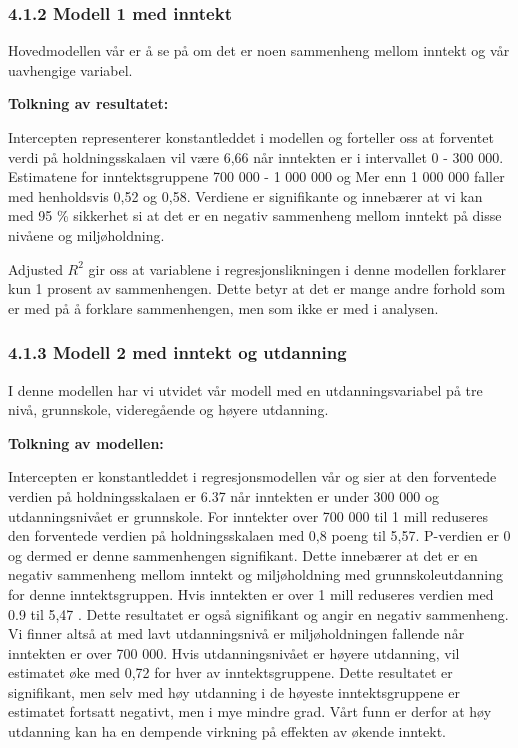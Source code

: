 \documentclass[
  12pt,
  letterpaper,
  DIV=11,
  numbers=noendperiod]{scrartcl}
\begin{document}
\hypertarget{modell-1-med-inntekt}{%
\subsubsection{4.1.2 Modell 1 med inntekt}\label{modell-1-med-inntekt}}

Hovedmodellen vår er å se på om det er noen sammenheng mellom inntekt og
vår uavhengige variabel.

\textbf{Tolkning av resultatet:}

Intercepten representerer konstantleddet i modellen og forteller oss at
forventet verdi på holdningsskalaen vil være 6,66 når inntekten er i
intervallet 0 - 300 000. Estimatene for inntektsgruppene 700 000 - 1 000
000 og Mer enn 1 000 000 faller med henholdsvis 0,52 og 0,58. Verdiene
er signifikante og innebærer at vi kan med 95 \% sikkerhet si at det er
en negativ sammenheng mellom inntekt på disse nivåene og miljøholdning.

Adjusted \(R^2\) gir oss at variablene i regresjonslikningen i denne
modellen forklarer kun 1 prosent av sammenhengen. Dette betyr at det er
mange andre forhold som er med på å forklare sammenhengen, men som ikke
er med i analysen.

\hypertarget{modell-2-med-inntekt-og-utdanning}{%
\subsubsection{4.1.3 Modell 2 med inntekt og
utdanning}\label{modell-2-med-inntekt-og-utdanning}}

I denne modellen har vi utvidet vår modell med en utdanningsvariabel på
tre nivå, grunnskole, videregående og høyere utdanning.

\textbf{Tolkning av modellen:}

Intercepten er konstantleddet i regresjonsmodellen vår og sier at den
forventede verdien på holdningsskalaen er 6.37 når inntekten er under
300 000 og utdanningsnivået er grunnskole. For inntekter over 700 000
til 1 mill reduseres den forventede verdien på holdningsskalaen med 0,8
poeng til 5,57. P-verdien er 0 og dermed er denne sammenhengen
signifikant. Dette innebærer at det er en negativ sammenheng mellom
inntekt og miljøholdning med grunnskoleutdanning for denne
inntektsgruppen. Hvis inntekten er over 1 mill reduseres verdien med 0.9
til 5,47 . Dette resultatet er også signifikant og angir en negativ
sammenheng. Vi finner altså at med lavt utdanningsnivå er
miljøholdningen fallende når inntekten er over 700 000. Hvis
utdanningsnivået er høyere utdanning, vil estimatet øke med 0,72 for
hver av inntektsgruppene. Dette resultatet er signifikant, men selv med
høy utdanning i de høyeste inntektsgruppene er estimatet fortsatt
negativt, men i mye mindre grad. Vårt funn er derfor at høy utdanning
kan ha en dempende virkning på effekten av økende inntekt.
\end{document}
